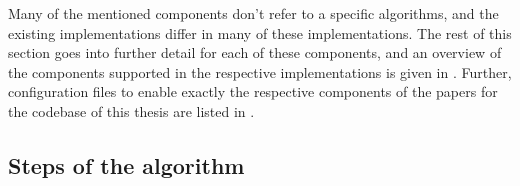 Many of the mentioned components don't refer to a specific algorithms, and the existing implementations \mainalgos differ in many of these implementations. The rest of this section goes into further detail for each of these components, and an overview of the components supported in the respective implementations is given in . Further, configuration files to enable exactly the respective components of the papers \mainalgos for the codebase of this thesis are listed in .



\subsection{Steps of the algorithm}
\label{sec:algorithm_steps}




